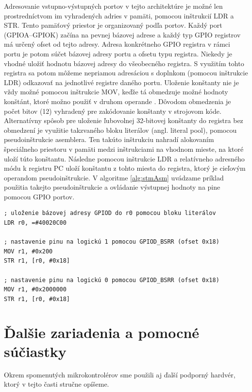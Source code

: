 Adresovanie vstupno-výstupných portov v tejto architektúre je možné len prostredníctvom im vyhradených adries v pamäti, pomocou inštrukcií LDR a STR. Tento pamäťový priestor je organizovaný podľa portov. Každý port (GPIOA--GPIOK) začína na pevnej bázovej adrese a každý typ GPIO registrov má určený ofset od tejto adresy. Adresa konkrétneho GPIO registra v rámci portu je potom súčet bázovej adresy portu a ofsetu typu registra. Niekedy je vhodné uložiť hodnotu bázovej adresy do všeobecného registra. S využitím tohto registra sa potom môžeme nepriamou adresáciou s doplnkom (pomocou inštrukcie LDR) odkazovať na jednotlivé registre daného portu. Uloženie konštanty nie je vždy možné pomocou inštrukcie MOV, keďže tá obmedzuje možné hodnoty konštánt, ktoré možno použiť v druhom operande \cite{stmInstruction}. Dôvodom obmedzenia je počet bitov (12) vyhradený pre zakódovanie konštanty v strojovom kóde. Alternatívny spôsob pre uloženie ľubovolnej 32-bitovej konštanty do registra bez obmedzení je využitie takzvaného bloku literálov (angl. literal pool), pomocou pseudoinštrukcie asemblera. Ten takúto inštrukciu nahradí alokovaním špeciálneho priestoru v pamäti medzi inštrukciami na vhodnom mieste, na ktoré uloží túto konštantu. Následne pomocou inštrukcie LDR a relatívneho adresného módu k registru PC uloží konštantu z tohto miesta do registra, ktorý je cieľovým operandom pseudoinštrukcie. V algoritme \ref{alg:stmAsm} uvádzame príklad použitia takejto pseudoinštrukcie a ovládanie výstupnej hodnoty na pine pomocou GPIO portov.

\begin{lstlisting}[float,language=AVR,caption={Nastavenie hodnoty výstupného pinu GPIOD 9 na STM32F4 v jazyku asembler. Pre uloženie bázovej adresy portu GPIOD použijeme blok literálov.}, label=alg:stmAsm]
; uloženie bázovej adresy GPIOD do r0 pomocou bloku literálov
LDR r0, =#40020C00

; nastavenie pinu na logickú 1 pomocou GPIOD_BSRR (ofset 0x18)
MOV r1, #0x200 
STR r1, [r0, #0x18] 

; nastavenie pinu na logickú 0 pomocou GPIOD_BSRR (ofset 0x18)
MOV r1, #0x2000000
STR r1, [r0, #0x18]
\end{lstlisting}

\section{Ďalšie zariadenia a pomocné súčiastky}
Okrem spomenutých mikrokontrolérov sme použili aj ďalší podporný hardvér, ktorý v tejto časti stručne opíšeme.

